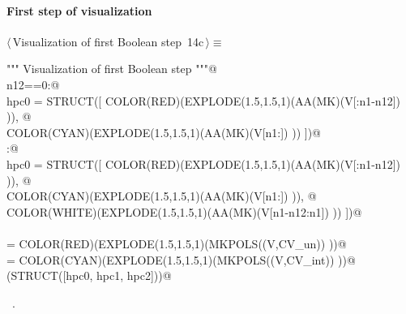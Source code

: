 \documentclass[11pt,oneside]{article}	%
\begin{document}
\paragraph{First step of visualization}

\begin{flushleft} \small
\begin{minipage}{\linewidth} \label{scrap26}
\protect{}$\langle\,$Visualization of first Boolean step\nobreak\ {\footnotesize 14c}$\,\rangle\equiv$
\vspace{-1ex}
\begin{list}{}{} \item
\mbox{}\verb@""" Visualization of first Boolean step  """@\\
\mbox{}\verb@if n12==0:@\\
\mbox{}\verb@   hpc0 = STRUCT([ COLOR(RED)(EXPLODE(1.5,1.5,1)(AA(MK)(V[:n1-n12]) )), @\\
\mbox{}\verb@            COLOR(CYAN)(EXPLODE(1.5,1.5,1)(AA(MK)(V[n1:]) )) ])@\\
\mbox{}\verb@else:@\\
\mbox{}\verb@   hpc0 = STRUCT([ COLOR(RED)(EXPLODE(1.5,1.5,1)(AA(MK)(V[:n1-n12]) )), @\\
\mbox{}\verb@            COLOR(CYAN)(EXPLODE(1.5,1.5,1)(AA(MK)(V[n1:]) )), @\\
\mbox{}\verb@            COLOR(WHITE)(EXPLODE(1.5,1.5,1)(AA(MK)(V[n1-n12:n1]) )) ])@\\
\mbox{}\verb@@\\
\mbox{} = COLOR(RED)(EXPLODE(1.5,1.5,1)(MKPOLS((V,CV_un)) ))@\\
\mbox{} = COLOR(CYAN)(EXPLODE(1.5,1.5,1)(MKPOLS((V,CV_int)) ))@\\
\mbox{}\verb@VIEW(STRUCT([hpc0, hpc1, hpc2]))@\\
\mbox{}\verb@@{\NWsep}
\end{list}
\vspace{-1ex}
\footnotesize\addtolength{\baselineskip}{-1ex}
\begin{list}{}{\setlength{\itemsep}{-\parsep}\setlength{\itemindent}{-\leftmargin}}
\item \NWtxtMacroRefIn\ .
\end{list}
\end{minipage}\\[4ex]
\end{flushleft}
\end{document}
